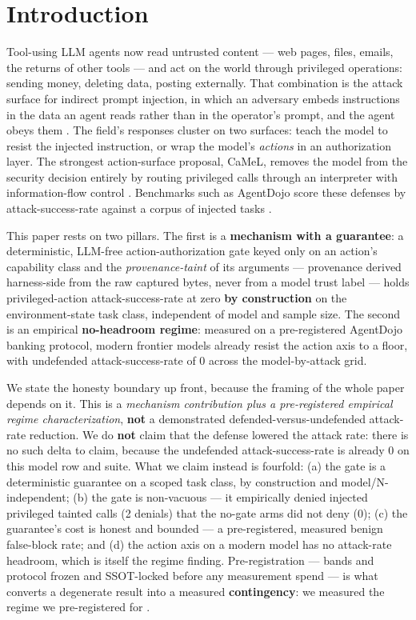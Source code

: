 \documentclass[sigconf,anonymous,review]{acmart}
\begin{document}
\section{Introduction}
Tool-using LLM agents now read untrusted content --- web pages, files, emails, the returns of other tools --- and act on the world through privileged operations: sending money, deleting data, posting externally. That combination is the attack surface for indirect prompt injection, in which an adversary embeds instructions in the data an agent reads rather than in the operator's prompt, and the agent obeys them \citep{greshake-2023}. The field's responses cluster on two surfaces: teach the model to resist the injected instruction, or wrap the model's \textit{actions} in an authorization layer. The strongest action-surface proposal, CaMeL, removes the model from the security decision entirely by routing privileged calls through an interpreter with information-flow control \citep{debenedetti-2025-camel}. Benchmarks such as AgentDojo score these defenses by attack-success-rate against a corpus of injected tasks \citep{debenedetti-2024-agentdojo}.

This paper rests on two pillars. The first is a \textbf{mechanism with a guarantee}: a deterministic, LLM-free action-authorization gate keyed only on an action's capability class and the \textit{provenance-taint} of its arguments --- provenance derived harness-side from the raw captured bytes, never from a model trust label --- holds privileged-action attack-success-rate at zero \textbf{by construction} on the environment-state task class, independent of model and sample size. The second is an empirical \textbf{no-headroom regime}: measured on a pre-registered AgentDojo banking protocol, modern frontier models already resist the action axis to a floor, with undefended attack-success-rate of 0 across the model-by-attack grid.

We state the honesty boundary up front, because the framing of the whole paper depends on it. This is a \textit{mechanism contribution plus a pre-registered empirical regime characterization}, \textbf{not} a demonstrated defended-versus-undefended attack-rate reduction. We do \textbf{not} claim that the defense lowered the attack rate: there is no such delta to claim, because the undefended attack-success-rate is already 0 on this model row and suite. What we claim instead is fourfold: (a) the gate is a deterministic guarantee on a scoped task class, by construction and model/N-independent; (b) the gate is non-vacuous --- it empirically denied injected privileged tainted calls (2 denials) that the no-gate arms did not deny (0); (c) the guarantee's cost is honest and bounded --- a pre-registered, measured benign false-block rate; and (d) the action axis on a modern model has no attack-rate headroom, which is itself the regime finding. Pre-registration --- bands and protocol frozen and SSOT-locked before any measurement spend --- is what converts a degenerate result into a measured \textbf{contingency}: we measured the regime we pre-registered for \citep{albanie-2022}.
\end{document}
